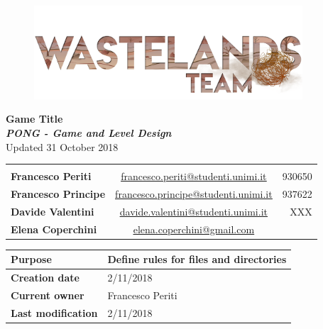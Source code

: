 \documentclass[12pt]{article}
\begin{document}
\begin{center}
  \begin{figure}
    \centering
  \vspace*{5\baselineskip}
  \includegraphics[width=10cm]{Documents/Images/logoTeam}
  \end{figure}

  {\large \textbf{Game Title}} \\
  \textbf{\textit{PONG - Game and Level Design}} \\
  {\small Updated 31 October 2018} \\

  \begin{tabular}{lcr}\\\\
    \textbf{Francesco Periti}	& \underline{\href{mailto:francesco.periti@studenti.unimi.it}{francesco.periti@studenti.unimi.it}}	& 930650 \\
    \textbf{Francesco Principe}	& \underline{\href{mailto:francesco.principe@studenti.unimi.it}{francesco.principe@studenti.unimi.it}}	& 937622 \\
    \textbf{Davide Valentini}	& \underline{\href{mailto:davide.valentini@studenti.unimi.it}{davide.valentini@studenti.unimi.it}}	& XXX \\
    \textbf{Elena Coperchini}	& \underline{\href{mailto:elena.coperchini@gmail.com}{elena.coperchini@gmail.com}}			& \\
  \end{tabular}


\begin{table}[] 
  \begin{tabular}{|l|l||}
    \hline
    \cellcolor{gray}\textbf{Purpose} &  Define rules for files and directories \\\hline
    \cellcolor{gray}\textbf{Creation date} & 2/11/2018 \\\hline
    \cellcolor{gray}\textbf{Current owner} & Francesco Periti \\\hline
    \cellcolor{gray}\textbf{Last modification} & 2/11/2018\\   \hline
  \end{tabular}
\end{table}


\end{center}
\end{document}
